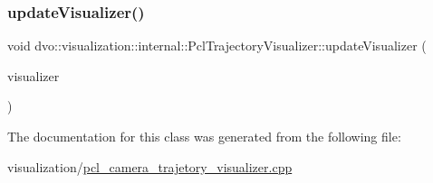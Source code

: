 \subsubsection{\texorpdfstring{update\+Visualizer()}{updateVisualizer()}}
{\footnotesize\ttfamily void dvo\+::visualization\+::internal\+::\+Pcl\+Trajectory\+Visualizer\+::update\+Visualizer (\begin{DoxyParamCaption}\item[{pcl\+::visualization\+::\+P\+C\+L\+Visualizer \&}]{visualizer }\end{DoxyParamCaption})\hspace{0.3cm}{\ttfamily [inline]}}



The documentation for this class was generated from the following file\+:\begin{DoxyCompactItemize}
\item 
visualization/\mbox{\hyperlink{pcl__camera__trajetory__visualizer_8cpp}{pcl\+\_\+camera\+\_\+trajetory\+\_\+visualizer.\+cpp}}\end{DoxyCompactItemize}
